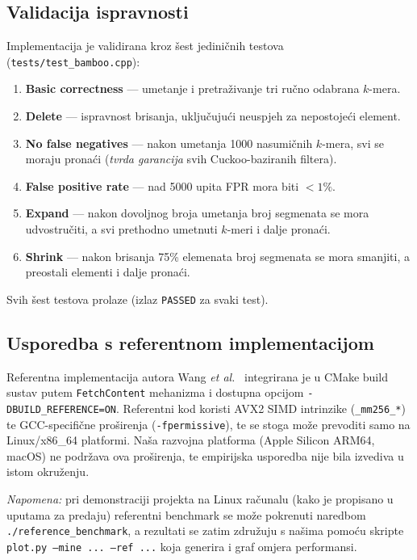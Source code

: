 \documentclass[12pt,a4paper]{article}
\begin{document}
\subsection{Validacija ispravnosti}
Implementacija je validirana kroz šest jediničnih testova
(\texttt{tests/test\_bamboo.cpp}):
\begin{enumerate}
    \item \textbf{Basic correctness} --- umetanje i pretraživanje tri ručno odabrana
          $k$-mera.
    \item \textbf{Delete} --- ispravnost brisanja, uključujući neuspjeh za nepostojeći
          element.
    \item \textbf{No false negatives} --- nakon umetanja 1000 nasumičnih
          $k$-mera, svi se moraju pronaći (\emph{tvrda garancija} svih Cuckoo-baziranih
          filtera).
    \item \textbf{False positive rate} --- nad 5000 upita FPR mora biti $< 1\%$.
    \item \textbf{Expand} --- nakon dovoljnog broja umetanja broj segmenata se mora
          udvostručiti, a svi prethodno umetnuti $k$-meri i dalje pronaći.
    \item \textbf{Shrink} --- nakon brisanja 75\% elemenata broj segmenata se mora
          smanjiti, a preostali elementi i dalje pronaći.
\end{enumerate}
Svih šest testova prolaze (izlaz \texttt{PASSED} za svaki test).

\subsection{Usporedba s referentnom implementacijom}
\label{sec:reference}
Referentna implementacija autora Wang \textit{et al.}~\cite{wanghanchengchn-repo}
integrirana je u CMake build sustav putem \texttt{FetchContent} mehanizma i dostupna
opcijom \texttt{-DBUILD\_REFERENCE=ON}. Referentni kod koristi AVX2 SIMD intrinzike
(\texttt{\_mm256\_*}) te GCC-specifične proširenja (\texttt{-fpermissive}), te se
stoga može prevoditi samo na Linux/x86\_64 platformi. Naša razvojna platforma (Apple
Silicon ARM64, macOS) ne podržava ova proširenja, te empirijska usporedba nije bila
izvediva u istom okruženju.

\emph{Napomena:} pri demonstraciji projekta na Linux računalu (kako je propisano u
uputama za predaju) referentni benchmark se može pokrenuti naredbom
\texttt{./reference\_benchmark}, a rezultati se zatim združuju s našima pomoću skripte
\texttt{plot.py --mine ... --ref ...} koja generira i graf omjera performansi.
\end{document}
